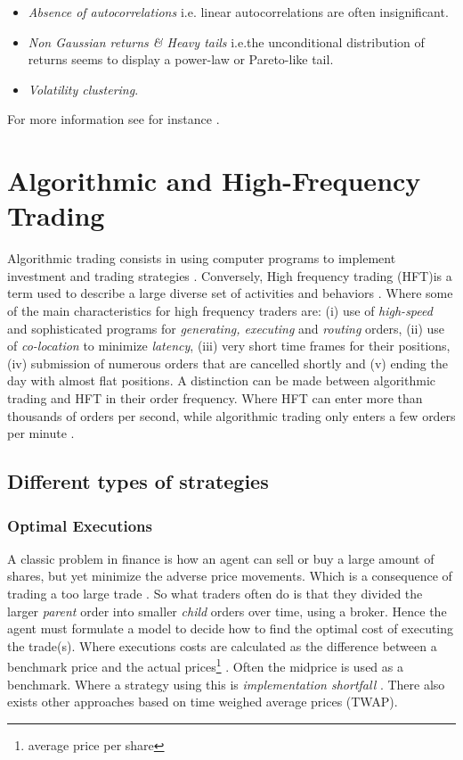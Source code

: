 \documentclass{kththesis}
\theoremstyle{definition}
\begin{document}
\begin{itemize}
    \item \textit{Absence of autocorrelations} i.e. linear autocorrelations are often insignificant. 
    \item \textit{Non Gaussian returns \& Heavy tails} i.e.the unconditional distribution of returns seems to display a power-law or Pareto-like tail.
    \item \textit{Volatility clustering}. 
\end{itemize}
For more information see for instance \textcite{cont2001empirical}.

\section{Algorithmic and High-Frequency Trading}
Algorithmic trading consists in using computer programs to implement investment and trading strategies \parencite{abergel2012market}. Conversely, High frequency trading (HFT)is a term used to describe a large diverse set of activities and behaviors \parencite{o2015high}. Where some of the main characteristics for high frequency traders are: (i) use of \textit{high-speed} and sophisticated programs for \textit{generating, executing} and \textit{routing} orders, (ii) use of \textit{co-location} to minimize \textit{latency}, (iii) very short time frames for their positions, (iv) submission of numerous orders that are cancelled shortly and (v) ending the day with almost flat positions. 
\newline
\newline
A distinction can be made between algorithmic trading and HFT in their order frequency. Where HFT can enter more than thousands of orders per second, while algorithmic trading only enters a few orders per minute \parencite{abergel2012market}.

\subsection{Different types of strategies}

\subsubsection*{Optimal Executions}
A classic problem in finance is how an agent can sell or buy a large amount of shares, but yet minimize the adverse price movements. Which is a consequence of trading a too large trade \parencite{cartea2015algorithmic}. So what traders often do is that they divided the larger \textit{parent} order into smaller \textit{child} orders over time, using a broker. Hence the agent must formulate a model to decide how to find the optimal cost of executing the trade(s). Where executions costs  are calculated as the difference between a benchmark price and the actual prices\footnote{average price per share} \parencite{cartea2015algorithmic}. Often the midprice is used as a benchmark. Where a strategy using this is \textit{implementation shortfall} \parencite{cartea2015algorithmic}. There also exists other approaches based on time weighed average prices (TWAP).
\end{document}
